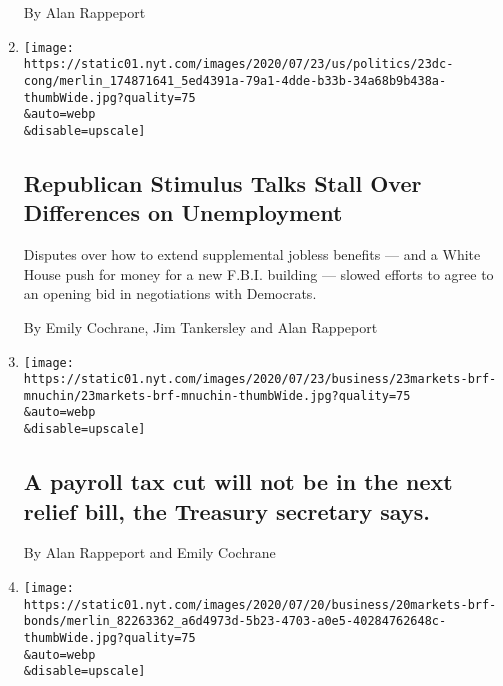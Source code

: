 \begin{enumerate}
  By Alan Rappeport
\item
  \href{/2020/07/23/us/politics/republicans-stimulus-coronavirus.html}{}

  \texttt{[image: https://static01.nyt.com/images/2020/07/23/us/politics/23dc-cong/merlin\_174871641\_5ed4391a-79a1-4dde-b33b-34a68b9b438a-thumbWide.jpg?quality=75\\\&auto=webp\\\&disable=upscale]}

  \hypertarget{republican-stimulus-talks-stall-over-differences-on-unemployment}{%
  \subsection{Republican Stimulus Talks Stall Over Differences on
  Unemployment}\label{republican-stimulus-talks-stall-over-differences-on-unemployment}}

  Disputes over how to extend supplemental jobless benefits --- and a
  White House push for money for a new F.B.I. building --- slowed
  efforts to agree to an opening bid in negotiations with Democrats.

  By Emily Cochrane, Jim Tankersley and Alan Rappeport
\item
  \href{/live/2020/07/23/business/stock-market-today-coronavirus/a-payroll-tax-cut-will-not-be-in-the-next-relief-bill-the-treasury-secretary-says}{}

  \texttt{[image: https://static01.nyt.com/images/2020/07/23/business/23markets-brf-mnuchin/23markets-brf-mnuchin-thumbWide.jpg?quality=75\\\&auto=webp\\\&disable=upscale]}

  \hypertarget{a-payroll-tax-cut-will-not-be-in-the-next-relief-bill-the-treasury-secretary-says}{%
  \subsection{A payroll tax cut will not be in the next relief bill, the
  Treasury secretary
  says.}\label{a-payroll-tax-cut-will-not-be-in-the-next-relief-bill-the-treasury-secretary-says}}

  By Alan Rappeport and Emily Cochrane
\item
  \href{/live/2020/07/20/business/stock-market-today-coronavirus/the-feds-bond-buying-program-draws-congressional-scrutiny}{}

  \texttt{[image: https://static01.nyt.com/images/2020/07/20/business/20markets-brf-bonds/merlin\_82263362\_a6d4973d-5b23-4703-a0e5-40284762648c-thumbWide.jpg?quality=75\\\&auto=webp\\\&disable=upscale]}

  \hypertarget{the-feds-bond-buying-program-draws-congressional-scrutiny}{%
}
\end{enumerate}
